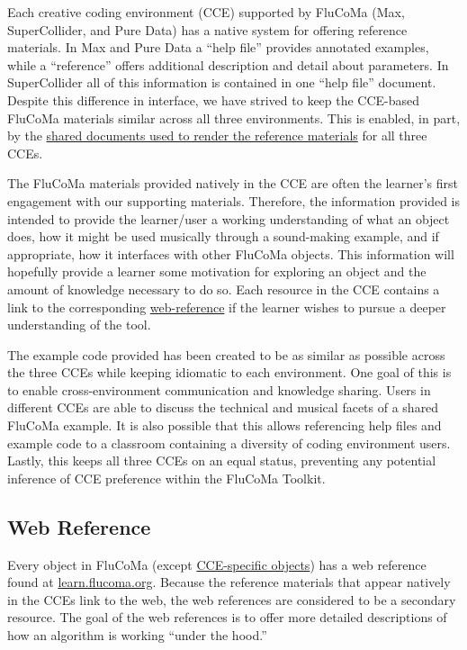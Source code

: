 \documentclass{article}
\begin{document}
Each creative coding environment (CCE) supported by FluCoMa (Max,
SuperCollider, and Pure Data) has a native system for offering reference
materials. In Max and Pure Data a ``help file'' provides annotated
examples, while a ``reference'' offers additional description and detail
about parameters. In SuperCollider all of this information is contained
in one ``help file'' document. Despite this difference in interface, we
have strived to keep the CCE-based FluCoMa materials similar across all
three environments. This is enabled, in part, by the
\href{https://github.com/flucoma/flucoma-docs}{shared documents used to
render the reference materials} for all three CCEs.

The FluCoMa materials provided natively in the CCE are often the
learner's first engagement with our supporting materials. Therefore, the
information provided is intended to provide the learner/user a working
understanding of what an object does, how it might be used musically
through a sound-making example, and if appropriate, how it interfaces
with other FluCoMa objects. This information will hopefully provide a
learner some motivation for exploring an object and the amount of
knowledge necessary to do so. Each resource in the CCE contains a link
to the corresponding \hyperref[web-reference]{web-reference} if the
learner wishes to pursue a deeper understanding of the tool.

The example code provided has been created to be as similar as possible
across the three CCEs while keeping idiomatic to each environment. One
goal of this is to enable cross-environment communication and knowledge
sharing. Users in different CCEs are able to discuss the technical and
musical facets of a shared FluCoMa example. It is also possible that
this allows referencing help files and example code to a classroom
containing a diversity of coding environment users. Lastly, this keeps
all three CCEs on an equal status, preventing any potential inference of
CCE preference within the FluCoMa Toolkit.

\subsection{Web Reference}\label{web-reference}

Every object in FluCoMa (except
\hyperref[cce-specific-objects]{CCE-specific objects}) has a web
reference found at \href{https://learn.flucoma.org}{learn.flucoma.org}.
Because the reference materials that appear natively in the CCEs link to the web,
the web references are considered to be a secondary resource. The goal
of the web references is to offer more detailed descriptions of how an
algorithm is working ``under the hood.''
\end{document}
